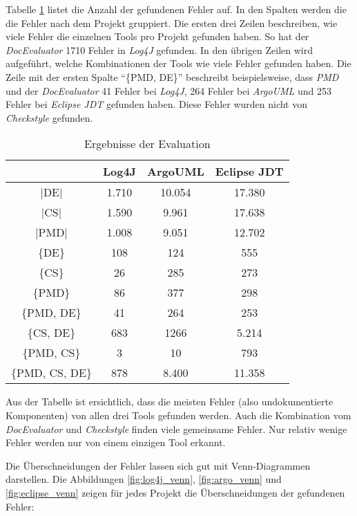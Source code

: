 Tabelle \ref{tab:eval_results} listet die Anzahl der gefundenen Fehler auf. In den Spalten werden die die Fehler nach dem Projekt gruppiert. Die ersten drei Zeilen beschreiben, wie viele Fehler die einzelnen Tools pro Projekt gefunden haben. So hat  der \textit{DocEvaluator} 1710 Fehler in \textit{Log4J} gefunden.  In den übrigen Zeilen wird aufgeführt, welche Kombinationen der Tools wie viele Fehler gefunden haben. Die Zeile mit der ersten Spalte \enquote{\{PMD, DE\}} beschreibt beispielsweise, dass \textit{PMD} und der  \textit{DocEvaluator} 41 Fehler bei \textit{Log4J}, 264 Fehler bei \textit{ArgoUML} und 253 Fehler bei \textit{Eclipse JDT} gefunden haben. Diese Fehler wurden nicht von \textit{Checkstyle} gefunden.  
\begin{table}[]
    \centering
\begin{tabular}{c|c|c|c}
          & Log4J & ArgoUML & Eclipse JDT \\ \hline
|DE|            & 1.710 & 10.054  & 17.380      \\ \hline
|CS|            & 1.590 & 9.961   & 17.638      \\ \hline
|PMD|           & 1.008 & 9.051   & 12.702      \\ \hline\hline
\{DE\}          & 108   & 124     & 555         \\ \hline
\{CS\}          & 26    & 285     & 273         \\ \hline
\{PMD\}         & 86    & 377     & 298         \\ \hline
\{PMD, DE\}     & 41    & 264     & 253         \\ \hline
\{CS, DE\}      & 683   & 1266    & 5.214       \\ \hline
\{PMD, CS\}     & 3     & 10      & 793         \\ \hline
\{PMD, CS, DE\} & 878   & 8.400   & 11.358      \\ \hline
\end{tabular}
    \caption{Ergebnisse der Evaluation}
    \label{tab:eval_results}
\end{table}

Aus der Tabelle ist ersichtlich, dass die meisten Fehler (also undokumentierte Komponenten) von allen drei Tools gefunden werden. Auch die Kombination vom \textit{DocEvaluator} und \textit{Checkstyle} finden viele gemeinsame Fehler. Nur relativ wenige Fehler werden nur von einem einzigen Tool erkannt. 

Die Überschneidungen der Fehler lassen sich gut mit Venn-Diagrammen darstellen.  Die Abbildungen \ref{fig:log4j_venn}, \ref{fig:argo_venn} und  \ref{fig:eclipse_venn} zeigen für jedes Projekt die Überschneidungen der gefundenen Fehler:

